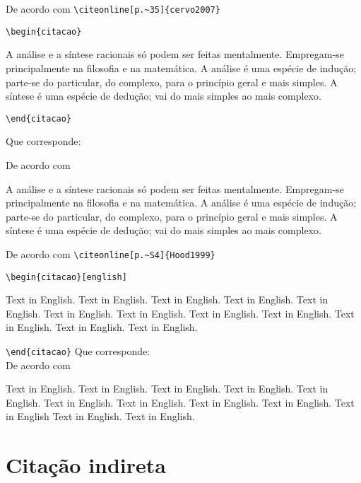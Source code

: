 \begin{alineas} 

\item 
De acordo com \verb+\citeonline[p.~35]{cervo2007}+

\verb+\begin{citacao}+

A análise e a síntese racionais só podem ser feitas mentalmente. Empregam-se principalmente na filosofia e na matemática. A análise é uma espécie de indução; parte-se do particular, do complexo, para o princípio geral e mais simples. A síntese é uma espécie de dedução; vai do mais simples ao mais complexo.

\verb+\end{citacao}+

Que corresponde: 

De acordo com 

\begin{citacao}
A análise e a síntese racionais só podem ser feitas mentalmente. Empregam-se principalmente na filosofia e na matemática. A análise é uma espécie de indução; parte-se do particular, do complexo, para o princípio geral e mais simples. A síntese é uma espécie de dedução; vai do mais simples ao mais complexo.
\end{citacao}

\item
De acordo com \verb+\citeonline[p.~S4]{Hood1999}+

\verb+\begin{citacao}[english]+

Text in English. Text in English. Text in English. Text in
English. Text in English. Text in English. Text in English. 
Text in English. Text in English. Text in English. Text in
English. Text in English.

\verb+\end{citacao}+
\newpage
Que corresponde: \\

 De acordo com 
\begin{citacao}[english]
	Text in English. Text in English. Text in English. Text in English. Text in English. Text in English. Text in English. Text in English. Text in English. Text in English Text in English. Text in English.
\end{citacao}

\end{alineas}

\section{Citação indireta}

